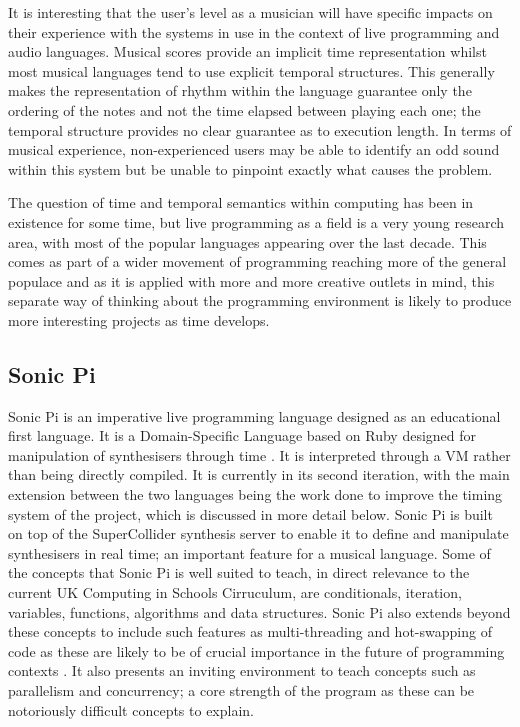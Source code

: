 \documentclass[11pt, abstracton, twoside, titlepage=true]{scrartcl}
\begin{document}
It is interesting that the user's level as a musician will have specific 
impacts on their experience with the systems in use in the context of live 
programming and audio languages. Musical scores provide an implicit time 
representation whilst most musical languages tend to use explicit temporal 
structures. This generally makes the representation of rhythm within the 
language guarantee only the ordering of the notes and not the time elapsed 
between playing each one; the temporal structure provides no clear guarantee as 
to execution length. In terms of musical experience, non-experienced 
users may be able to identify an odd sound within this system but be unable to 
pinpoint exactly what causes the problem. 

The question of time and temporal semantics within computing has been in 
existence for some time, but live programming as a field is a very young 
research area, with most of the popular languages appearing over the last 
decade. This comes as part of a wider movement of programming reaching more of 
the general populace and as it is applied with more and more creative outlets 
in mind, this separate way of thinking about the programming environment is 
likely to produce more interesting projects as time develops. 

\subsection{Sonic Pi}
Sonic Pi is an imperative live programming language designed as an educational 
first language. It is a Domain-Specific Language based on Ruby designed for 
manipulation of synthesisers through time \cite{AB13}. It is interpreted through 
a VM rather than being directly compiled. It is currently in its 
second iteration, with the main extension between the two languages being the 
work done to improve the timing system of the project, which is discussed in 
more detail below. Sonic Pi is built on top of the SuperCollider synthesis 
server to enable it to define and manipulate synthesisers in real time; an 
important feature for a musical language. Some of the concepts that Sonic Pi 
is well suited to teach, in direct relevance to the current UK Computing in 
Schools Cirruculum, are conditionals, iteration, variables, functions, 
algorithms and data structures. Sonic Pi also extends beyond these concepts to 
include such features as multi-threading and hot-swapping of code as these are 
likely to be of crucial importance in the future of programming contexts \cite{
AOB14}. It also presents an inviting environment to teach concepts such as 
parallelism and concurrency; a core strength of the program as these can be
notoriously difficult concepts to explain.
\end{document}
